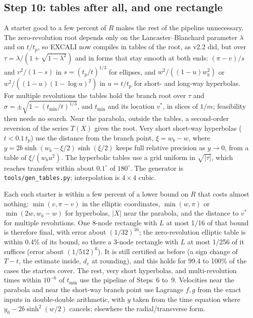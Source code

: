 \documentclass[11pt]{article}
\newcommand{\code}[1]{\texttt{#1}}
\begin{document}
\subsection*{Step 10: tables after all, and one rectangle}
A starter good to a few percent of $R$ makes the rest of the pipeline unnecessary. The zero-revolution root depends only on the Lancaster--Blanchard parameter $\lambda$ and on $t/t_p$, so EXCALI now compiles in tables of the root, as v2.2 did, but over $\tau=\lambda/(1+\sqrt{1-\lambda^2})$ and in forms that stay smooth at both ends: $(\pi-v)/s$ and $v^2/(1-s)$ in $s=(t_p/t)^{1/3}$ for ellipses, and $w^2/((1-u)w_b^2)$ or $w^2/((1-u)(1-\log u)^2)$ in $u=t/t_p$ for short- and long-way hyperbolas. For multiple revolutions the tables hold the branch root over $\tau$ and $\sigma=\pm\sqrt{1-(t_\text{min}/t)^{1/3}}$, and $t_\text{min}$ and its location $v^\ast$, in slices of $1/m$; feasibility then needs no search. Near the parabola, outside the tables, a second-order reversion of the series $T(X)$ gives the root. Very short short-way hyperbolas ($t<0.1\,t_p$) use the distance from the branch point, $\xi=w_b-w$, where $y=2b\sinh(w_b-\xi/2)\sinh(\xi/2)$ keeps full relative precision as $y\to0$, from a table of $\xi/(w_b u^2)$. The hyperbolic tables use a grid uniform in $\sqrt{|\tau|}$, which reaches transfers within about $0.1^\circ$ of $180^\circ$. The generator is \code{tools/gen\_tables.py}; interpolation is $4\times4$ cubic.

Each such starter is within a few percent of a lower bound on $R$ that costs almost nothing: $\min(v,\pi-v)$ in the elliptic coordinates, $\min(w,\pi)$ or $\min(2w,w_b-w)$ for hyperbolas, $|X|$ near the parabola, and the distance to $v^\ast$ for multiple revolutions. One 8-node rectangle with $L$ at most 1/16 of that bound is therefore final, with error about $(1/32)^{16}$; the zero-revolution elliptic table is within 0.4\% of its bound, so there a 3-node rectangle with $L$ at most 1/256 of it suffices (error about $(1/512)^6$). It is still certified as before (a sign change of $T-t$, the estimate inside, $d_e$ at rounding), and this holds for 99.4 to 100\% of the cases the starters cover. The rest, very short hyperbolas, and multi-revolution times within $10^{-6}$ of $t_\text{min}$ use the pipeline of Steps~6 to~9. Velocities near the parabola and near the short-way branch point use Lagrange $f,g$ from the exact inputs in double-double arithmetic, with $y$ taken from the time equation where $y_0-2b\sinh^2(w/2)$ cancels; elsewhere the radial/transverse form.
\end{document}
